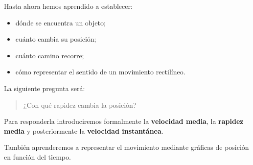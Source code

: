 Hasta ahora hemos aprendido a establecer:

\begin{itemize}
    \item dónde se encuentra un objeto;
    \item cuánto cambia su posición;
    \item cuánto camino recorre;
    \item cómo representar el sentido de un movimiento rectilíneo.
\end{itemize}

La siguiente pregunta será:

\begin{quote}
¿Con qué rapidez cambia la posición?
\end{quote}

Para responderla introduciremos formalmente la
\textbf{velocidad media}, la \textbf{rapidez media} y posteriormente la
\textbf{velocidad instantánea}.

También aprenderemos a representar el movimiento mediante gráficas de
posición en función del tiempo.


